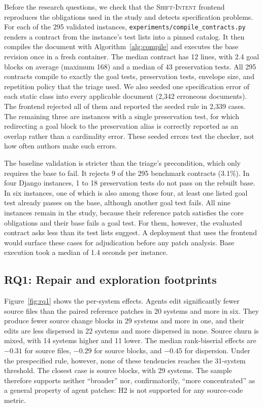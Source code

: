 \documentclass[a4paper,fleqn]{cas-sc}
\newcommand{\dsl}{\textsc{Shift-Intent}}
\begin{document}
Before the research questions, we check that the \dsl{} frontend reproduces the obligations used in the study and detects specification problems. For each of the 295 validated instances, \nolinkurl{experiments/compile_contracts.py} renders a contract from the instance's test lists into a pinned catalog. It then compiles the document with Algorithm~\ref{alg:compile} and executes the base revision once in a fresh container. The median contract has 12 lines, with 2.4 goal blocks on average (maximum 168) and a median of 43 preservation tests. All 295 contracts compile to exactly the goal tests, preservation tests, envelope size, and repetition policy that the triage used. We also seeded one specification error of each static class into every applicable document (2,342 erroneous documents). The frontend rejected all of them and reported the seeded rule in 2,339 cases. The remaining three are instances with a single preservation test, for which redirecting a goal block to the preservation alias is correctly reported as an overlap rather than a cardinality error. These seeded errors test the checker, not how often authors make such errors.

The baseline validation is stricter than the triage's precondition, which only requires the base to fail. It rejects 9 of the 295 benchmark contracts (3.1\%). In four Django instances, 1 to 18 preservation tests do not pass on the rebuilt base. In six instances, one of which is also among those four, at least one listed goal test already passes on the base, although another goal test fails. All nine instances remain in the study, because their reference patch satisfies the core obligations and their base fails a goal test. For them, however, the evaluated contract asks less than its test lists suggest. A deployment that uses the frontend would surface these cases for adjudication before any patch analysis. Base execution took a median of 1.4 seconds per instance.

\subsection{RQ1: Repair and exploration footprints}\label{sec:rq1}

Figure~\ref{fig:rq1} shows the per-system effects. Agents edit significantly fewer source files than the paired reference patches in 20 systems and more in six. They produce fewer source change blocks in 29 systems and more in one, and their edits are less dispersed in 22 systems and more dispersed in none. Source churn is mixed, with 14 systems higher and 11 lower. The median rank-biserial effects are $-0.31$ for source files, $-0.29$ for source blocks, and $-0.45$ for dispersion. Under the prespecified rule, however, none of these tendencies reaches the 31-system threshold. The closest case is source blocks, with 29 systems. The sample therefore supports neither ``broader'' nor, confirmatorily, ``more concentrated'' as a general property of agent patches: H2 is not supported for any source-code metric.
\end{document}
